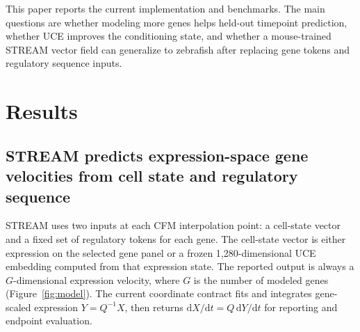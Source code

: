 \documentclass[11pt]{article}
\newcommand{\stream}{STREAM}
\newcommand{\uce}{UCE}
\newcommand{\dd}{\mathrm{d}}
\begin{document}
This paper reports the current implementation and benchmarks. The main
questions are whether modeling more genes helps held-out timepoint prediction,
whether \uce{} improves the conditioning state, and whether a mouse-trained
\stream{} vector field can generalize to zebrafish after replacing gene tokens
and regulatory sequence inputs.

\section{Results}

\subsection{STREAM predicts expression-space gene velocities from cell state and regulatory sequence}

\stream{} uses two inputs at each CFM interpolation point: a cell-state vector
and a fixed set of regulatory tokens for each gene. The cell-state vector is
either expression on the selected gene panel or a frozen 1,280-dimensional
\uce{} embedding computed from that expression state. The reported output is
always a $G$-dimensional expression velocity, where $G$ is the number of
modeled genes (Figure~\ref{fig:model}). The current coordinate contract fits
and integrates gene-scaled expression $Y=Q^{-1}X$, then returns
$\dd X/\dd t=Q\,\dd Y/\dd t$ for reporting and endpoint evaluation.
\end{document}
